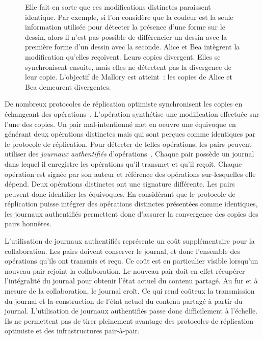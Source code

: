 \begin{figure}[hbt]
{Elle fait en sorte que ces modifications distinctes paraissent identique.
Par exemple, si l'on considère que la couleur est la seule information utilisée pour détecter la présence d'une forme sur le dessin, alors il n'est pas possible de différencier un dessin avec la première forme d'un dessin avec la seconde.
 Alice et Bea intègrent la modification qu'elles reçoivent.
Leurs copies divergent.
Elles se synchronisent ensuite, mais elles ne détectent pas la divergence de leur copie.
L'objectif de Mallory est atteint~: les copies de Alice et Bea demeurent divergentes.}\label{fig:equivocation-scenario}
\end{figure}

De nombreux protocoles de réplication optimiste synchronisent les copies en échangeant des opérations~\autocite{baquero_2018_pure-op-crdt}.
L'opération synthétise une modification effectuée sur l'une des copies.
Un pair mal-intentionné met en oeuvre une équivoque en générant deux opérations distinctes mais qui sont perçues comme identiques par le protocole de réplication.
Pour détecter de telles opérations, les pairs peuvent utiliser des \emph{journaux authentifiés} d'opérations~\autocite{li_2004_sundr,mahajan_depot_2011,truong_authenticating_2012}.
Chaque pair possède un journal dans lequel il enregistre les opérations qu'il transmet et qu'il reçoit.
Chaque opération est signée par son auteur et référence des opérations sur-lesquelles elle dépend.
Deux opérations distinctes ont une signature différente.
Les pairs peuvent donc identifier les équivoques.
En considérant que le protocole de réplication puisse intégrer des opérations distinctes présentées comme identiques, les journaux authentifiés permettent donc d'assurer la convergence des copies des pairs honnêtes.

L'utilisation de journaux authentifiés représente un coût supplémentaire pour la collaboration.
Les pairs doivent conserver le journal, et donc l'ensemble des opérations qu'ils ont transmis et reçu.
Ce coût est en particulier visible lorsqu'un nouveau pair rejoint la collaboration.
Le nouveau pair doit en effet récupérer l'intégralité du journal pour obtenir l'état actuel du contenu partagé.
Au fur et à mesure de la collaboration, le journal croît.
Ce qui rend coûteux la transmission du journal et la construction de l'état actuel du contenu partagé à partir du journal.
L'utilisation de journaux authentifiés passe donc difficilement à l'échelle.
Ils ne permettent pas de tirer pleinement avantage des protocoles de réplication optimiste et des infrastructures pair-à-pair.

